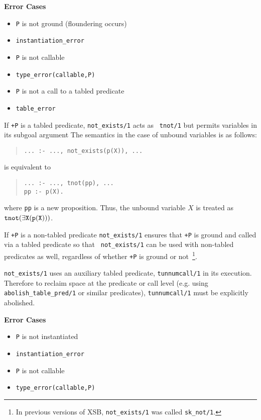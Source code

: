 \begin{description}
{\bf Error Cases}
\begin{itemize}
\item	{\tt P} is not ground (floundering occurs)
\bi
    \item {\tt instantiation\_error}
\ei
\item	{\tt P} is not callable
\bi
     \item {\tt type\_error(callable,P)}
\ei
\item {\tt P} is not a call to a tabled predicate
\bi
     \item{\tt table\_error}
\ei
\end{itemize}

If {\tt +P} is a tabled predicate, {\tt not\_exists/1} acts as {\tt
  tnot/1} but permits variables in its subgoal argument
The semantics in the case of unbound variables is as follows:
\begin{quote} 
\tt ... :- ...,~not\_exists(p(X)),~...  \end{quote} 
is equivalent to 
\begin{quote}
 \tt ... :- ..., tnot(pp),~...\\ pp :- p(X).
\end{quote} 
where {\tt pp} is a new proposition. Thus, the unbound variable $X$ is
treated as $\tt tnot(\exists X (p(X)))$.

If {\tt +P} is a non-tabled predicate {\tt not\_exists/1} ensures that
{\tt +P} is ground and called via a tabled predicate so that {\tt
  not\_exists/1} can be used with non-tabled predicates as well,
regardless of whether {\tt +P} is ground or not~\footnote{In previous
  versions of XSB, {\tt not\_exists/1} was called {\tt sk\_not/1}.}.

{\tt not\_exists/1} uses an auxiliary tabled predicate, {\tt tunnumcall/1}
in its execution.  Therefore to reclaim space at the predicate or call
level (e.g. using {\tt abolish\_table\_pred/1} or similar predicates),
{\tt tunnumcall/1} must be explicitly abolished.

{\bf Error Cases}
\begin{itemize}
\item	{\tt P} is not instantiated
\bi
    \item {\tt instantiation\_error}
\ei
\item	{\tt P} is not callable
\bi
     \item {\tt type\_error(callable,P)}
\ei
\end{itemize}


\end{description}
